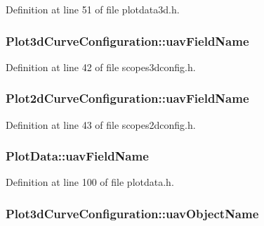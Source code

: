 Definition at line 51 of file plotdata3d.\-h.

\hypertarget{group___scope_plugin_ga16c893aa5d7da613ba51f6bd7bf70fc8}{
\subsubsection[{uav\-Field\-Name}]{ Plot3d\-Curve\-Configuration\-::uav\-Field\-Name}}\label{group___scope_plugin_ga16c893aa5d7da613ba51f6bd7bf70fc8}


Definition at line 42 of file scopes3dconfig.\-h.

\hypertarget{group___scope_plugin_ga5f9e57253d839d8b0094e4360f61155f}{
\subsubsection[{uav\-Field\-Name}]{ Plot2d\-Curve\-Configuration\-::uav\-Field\-Name}}\label{group___scope_plugin_ga5f9e57253d839d8b0094e4360f61155f}


Definition at line 43 of file scopes2dconfig.\-h.

\hypertarget{group___scope_plugin_ga3b137cdb062886f986237f8c9b527c22}{
\subsubsection[{uav\-Field\-Name}]{ Plot\-Data\-::uav\-Field\-Name\hspace{0.3cm}{\ttfamily [protected]}}}\label{group___scope_plugin_ga3b137cdb062886f986237f8c9b527c22}


Definition at line 100 of file plotdata.\-h.

\hypertarget{group___scope_plugin_gae997da1be9b0e82a84d8d19292c28984}{
\subsubsection[{uav\-Object\-Name}]{ Plot3d\-Curve\-Configuration\-::uav\-Object\-Name}}\label{group___scope_plugin_gae997da1be9b0e82a84d8d19292c28984}


